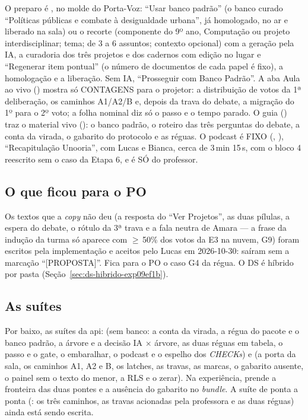 O preparo é , no molde do
Porta-Voz: \enquote{Usar banco padrão} (o banco curado \enquote{Políticas
públicas e combate à desigualdade urbana}, já homologado, no ar e liberado
na sala) ou o recorte (componente do 9º ano, Computação ou projeto
interdisciplinar; tema; de 3 a 6 assuntos; contexto opcional) com a geração
pela IA, a curadoria dos três projetos e dos cadernos com edição no lugar e
\enquote{Regenerar item pontual} (o número de documentos de cada papel é fixo),
a homologação e a liberação. Sem IA, \enquote{Prosseguir com Banco Padrão}.
A aba Aula ao vivo ()
mostra só CONTAGENS para o projetor: a distribuição de votos da 1ª
deliberação, os caminhos A1/A2/B e, depois da trava do debate, a migração
do 1º para o 2º voto; a folha nominal diz só o passo e o tempo parado. O
guia () traz o material vivo
(): o banco padrão, o roteiro
das três perguntas do debate, a conta da virada, o gabarito do protocolo e
as réguas. O podcast é FIXO (, ),
\enquote{Recapitulação Unooria}, com Lucas e Bianca, cerca de 3\,min 15\,s,
com o bloco 4 reescrito sem o caso da Etapa 6, e é SÓ do professor.

\subsection{O que ficou para o PO}

Os textos que a \emph{copy} não deu (a resposta do \enquote{Ver Projetos},
as duas pílulas, a espera do debate, o rótulo da 3ª trava e a fala neutra de
Amara --- a frase da indução da turma só aparece com $\geq$\,50\% dos votos
da E3 na nuvem, G9) foram escritos pela implementação e aceitos pelo Lucas em
2026-10-30: saíram sem a marcação \enquote{[PROPOSTA]}. Fica para o PO o caso
G4 da régua. O DS é híbrido por pasta
(Seção~\ref{sec:ds-hibrido-exp09ef1b}).

\subsection*{As suítes}

Por baixo, as suítes da api: 
(sem banco: a conta da virada, a régua do pacote e o banco padrão, a árvore e
a decisão IA $\times$ árvore, as duas réguas em tabela, o passo e o gate, o
embaralhar, o podcast e o espelho dos \emph{CHECKs}) e
 (a porta da sala, os
caminhos A1, A2 e B, os latches, as travas, as marcas, o gabarito ausente, o
painel sem o texto do menor, a RLS e o zerar). Na experiência,
 prende a fronteira das duas pontes e a ausência do
gabarito no \emph{bundle}. A suíte de ponta a ponta
(: os três caminhos, as
travas acionadas pela professora e as duas réguas) ainda está sendo escrita.

